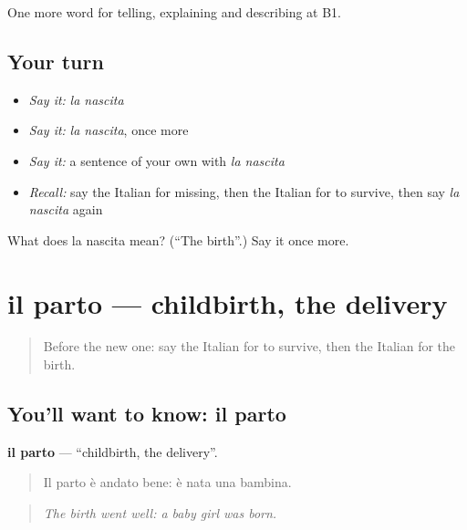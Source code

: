 \begin{grammarlens}[title={What you've built}]
One more word for telling, explaining and describing at B1.
\end{grammarlens}

\subsection*{Your turn}
\begin{itemize}
\raggedright
  \item \emph{Say it:} \emph{la nascita}
  \item \emph{Say it:} \emph{la nascita}, once more
  \item \emph{Say it:} a sentence of your own with \emph{la nascita}
  \item \emph{Recall:} say the Italian for missing, then the Italian for to survive, then say \emph{la nascita} again
\end{itemize}

\begin{tcolorbox}[breakable,colback=teal!4,colframe=teal!35!black,title={Before you move on}]
What does la nascita mean? (\textquotedblleft{}The birth\textquotedblright{}.) Say it once more.
\end{tcolorbox}
\section[il parto]{il parto — childbirth, the delivery}

\label{lesson:IT-C307-parto}



\begin{quote}
Before the new one: say the Italian for to survive, then the Italian for the birth.
\end{quote}

\subsection*{You'll want to know: il parto}
\textbf{il parto} — \textquotedblleft{}childbirth, the delivery\textquotedblright{}.

\begin{quote}
Il parto è andato bene: è nata una bambina.
\end{quote}

\begin{quote}
\emph{The birth went well: a baby girl was born.}
\end{quote}

